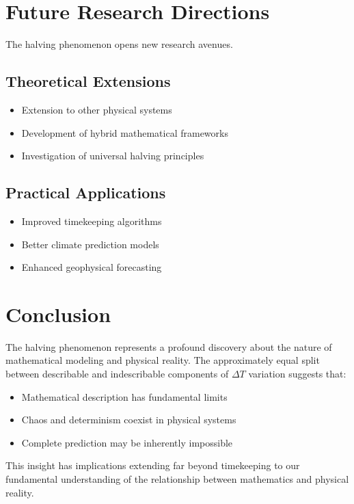 \documentclass[12pt,a4paper]{report}
\begin{document}
\section{Future Research Directions}

The halving phenomenon opens new research avenues.

\subsection{Theoretical Extensions}

\begin{itemize}
\item Extension to other physical systems
\item Development of hybrid mathematical frameworks
\item Investigation of universal halving principles
\end{itemize}

\subsection{Practical Applications}

\begin{itemize}
\item Improved timekeeping algorithms
\item Better climate prediction models
\item Enhanced geophysical forecasting
\end{itemize}

\section{Conclusion}

The halving phenomenon represents a profound discovery about the nature of mathematical modeling and physical reality. The approximately equal split between describable and indescribable components of $\Delta T$ variation suggests that:

\begin{itemize}
\item Mathematical description has fundamental limits
\item Chaos and determinism coexist in physical systems
\item Complete prediction may be inherently impossible
\end{itemize}

This insight has implications extending far beyond timekeeping to our fundamental understanding of the relationship between mathematics and physical reality.
\end{document}
